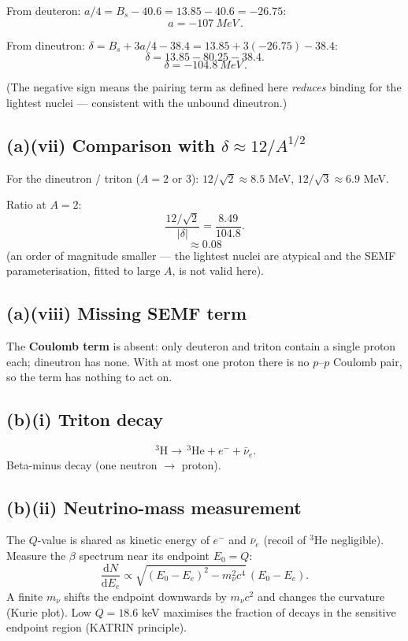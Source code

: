 \documentclass[11pt]{article}
\newcommand{\de}{\mathrm{d}}
\begin{document}
From deuteron: $a/4 = B_s - 40.6 = 13.85-40.6 = -26.75$:
\[ \boxed{\,a = \SI{-107}{MeV}\,}. \]

From dineutron: $\delta = B_s + 3a/4 - 38.4 = 13.85 + 3(-26.75) - 38.4$:
\[ \delta = 13.85 - 80.25 - 38.4. \]
\[ \boxed{\,\delta = \SI{-104.8}{MeV}\,}. \]

(The negative sign means the pairing term as defined here \emph{reduces} binding for the lightest nuclei --- consistent with the unbound dineutron.)

\subsection*{(a)(vii) Comparison with $\delta\approx 12/A^{1/2}$}

For the dineutron / triton ($A=2$ or $3$): $12/\sqrt{2}\approx 8.5$ MeV, $12/\sqrt{3}\approx 6.9$ MeV.

Ratio at $A=2$:
\[ \frac{12/\sqrt{2}}{|\delta|} = \frac{8.49}{104.8}. \]
\[ \boxed{\,\approx 0.08\,} \]
(an order of magnitude smaller --- the lightest nuclei are atypical and the SEMF parameterisation, fitted to large $A$, is not valid here).

\subsection*{(a)(viii) Missing SEMF term}

The \textbf{Coulomb term} is absent: only deuteron and triton contain a single proton each; dineutron has none. With at most one proton there is no $p$--$p$ Coulomb pair, so the term has nothing to act on.

\subsection*{(b)(i) Triton decay}

\[ \,^3\mathrm{H} \to \,^3\mathrm{He} + e^- + \bar\nu_e. \]
Beta-minus decay (one neutron $\to$ proton).

\subsection*{(b)(ii) Neutrino-mass measurement}

The $Q$-value is shared as kinetic energy of $e^-$ and $\bar\nu_e$ (recoil of $^3$He negligible). Measure the $\beta$ spectrum near its endpoint $E_0=Q$:
\[ \frac{\de N}{\de E_e} \propto \sqrt{(E_0-E_e)^2 - m_\nu^2 c^4}\,(E_0-E_e). \]
A finite $m_\nu$ shifts the endpoint downwards by $m_\nu c^2$ and changes the curvature (Kurie plot). Low $Q=18.6$ keV maximises the fraction of decays in the sensitive endpoint region (KATRIN principle).
\end{document}
